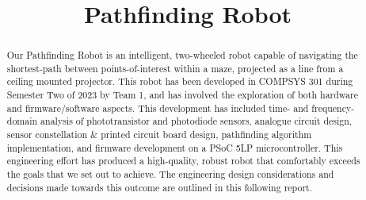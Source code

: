 \documentclass[conference]{IEEEtran}
\begin{document}
\title{Pathfinding Robot}

\author{
	\and
	\and
	\and
}

\maketitle

\begin{abstract}
	Our Pathfinding Robot is an intelligent, two-wheeled robot capable of navigating the shortest-path between points-of-interest within a maze, projected as a line from a ceiling mounted projector.
	This robot has been developed in COMPSYS 301 during Semester Two of 2023 by Team 1, and has involved the exploration of both hardware and firmware/software aspects.
	This development has included time- and frequency-domain analysis of phototransistor and photodiode sensors, analogue circuit design, sensor constellation \& printed circuit board design, pathfinding algorithm implementation, and firmware development on a PSoC 5LP microcontroller.
	This engineering effort has produced a high-quality, robust robot that comfortably exceeds the goals that we set out to achieve.
	The engineering design considerations and decisions made towards this outcome are outlined in this following report.
\end{abstract}
\end{document}
